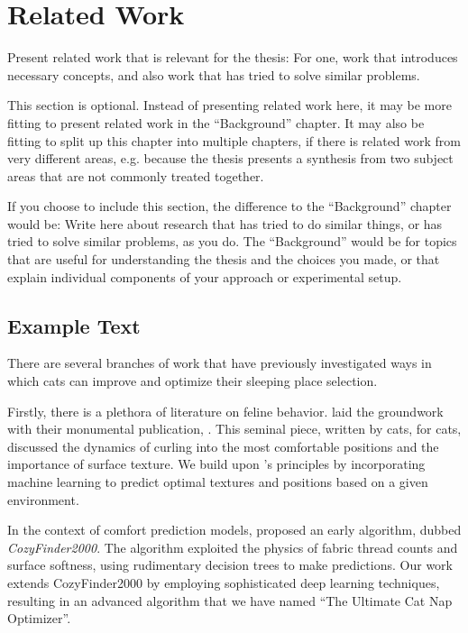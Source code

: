\chapter{Related Work}\label{chap:related}

Present related work that is relevant for the thesis:
For one, work that introduces necessary concepts, and also work that has tried to solve similar problems.

This section is optional.
Instead of presenting related work here, it may be more fitting to present related work in the ``Background'' chapter.
It may also be fitting to split up this chapter into multiple chapters, if there is related work from very different areas, e.g. because the thesis presents a synthesis from two subject areas that are not commonly treated together.

If you choose to include this section, the difference to the ``Background'' chapter would be:
Write here about research that has tried to do similar things, or has tried to solve similar problems, as you do.
The ``Background'' would be for topics that are useful for understanding the thesis and the choices you made, or that explain individual components of your approach or experimental setup. 

\section{Example Text}

There are several branches of work that have previously investigated ways in which cats can improve and optimize their sleeping place selection.

Firstly, there is a plethora of literature on feline behavior.
\citet{whiskers1997art} laid the groundwork with their monumental publication, .
This seminal piece, written by cats, for cats, discussed the dynamics of curling into the most comfortable positions and the importance of surface texture.
We build upon \citeauthor{whiskers1997art}'s principles by incorporating machine learning to predict optimal textures and positions based on a given environment.

In the context of comfort prediction models, \citet{fluffytail2002cozyfinder} proposed an early algorithm, dubbed \emph{CozyFinder2000}.
The algorithm exploited the physics of fabric thread counts and surface softness, using rudimentary decision trees to make predictions.
Our work extends CozyFinder2000 by employing sophisticated deep learning techniques, resulting in an advanced algorithm that we have named “The Ultimate Cat Nap Optimizer”.

